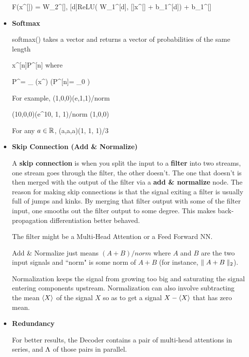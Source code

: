 \documentclass[12pt]{article}
\begin{document}
\begin{itemize}
\beq
F(x^{[\ell]}) = W_2^{[\ell], [d]}ReLU(
W_1^{[d], [\ell]}x^{[\ell]} + b_1^{[d]})  + b_1^{[\ell]}
\eeq

\item {\bf Softmax}

softmax() takes a vector and returns
a vector of probabilities of the same length

\beq
x^{[n]}\rarrow P^{[n]}
\eeq
where

\beq
P^\alp=
{\sum_{\alp\in[n]} \exp(x^\alp )}
\;\;
\left(P^{[n]}=
{_0}
\right)
\eeq

For example,
\beq
(1,0,0)\rarrow (e,1,1)/norm
\eeq

\beq
(10,0,0)\rarrow (e^{10}, 1, 1)/norm \approx (1,0,0)
\eeq

For any $a\in{ \mathbb{R}}$,
\beq
(a,a,a)\rarrow (1, 1, 1)/3
\eeq


\item {\bf Skip Connection (Add \& Normalize)}

A {\bf skip connection} is when you split the
input to a {\bf filter} into two streams, one stream goes through
the filter, the other doesn't. The one that doesn't
is then merged with the output of the filter via a {\bf add \& normalize} node. The reason for making skip connections
is that the signal exiting a filter is usually full of
jumps and kinks. By merging that filter output
with some  of the filter input, one smooths out the filter output
to some degree. This makes back-propagation differentiation
better behaved.

The filter might be a Multi-Head Attention or a Feed Forward NN.

Add \& Normalize just means $(A + B)/norm$ where $A$ and $B$
are the two input signals and ``norm" is some norm of $A+B$ (for
instance, $\parallel A+B\parallel_2$).

Normalization keeps the signal from growing too big and saturating the signal entering components upstream.
Normalization can also involve subtracting the mean $\left\langle X\right\rangle$ of the signal $X$  so as to get a signal $X-\left\langle X\right\rangle$  that has zero mean.

\item {\bf Redundancy}

For better results, the Decoder contains a pair of multi-head attentions in series, and $\Lambda$ of those pairs in parallel.



\end{itemize}
\end{document}
